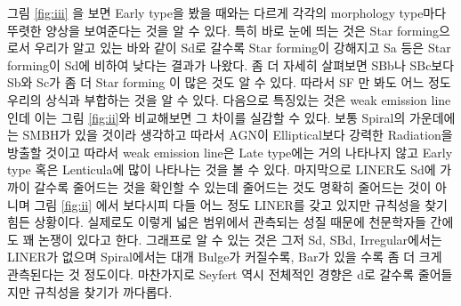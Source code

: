 \documentclass[a4paper,11pt]{article}
\begin{document}
그림 \ref{fig:iii} 을 보면 Early type을 봤을 때와는 다르게 각각의 morphology type마다 뚜렷한 양상을 보여준다는 것을 알 수 있다. 
특히 바로 눈에 띄는 것은 Star forming으로서 우리가 알고 있는 바와 같이 Sd로 갈수록 Star forming이 강해지고 Sa 등은 Star forming이 Sd에 비하여 낮다는 결과가 나왔다.
좀 더 자세히 살펴보면 SBb나 SBc보다 Sb와 Sc가 좀 더 Star forming 이 많은 것도 알 수 있다. 따라서 SF 만 봐도 어느 정도 우리의 상식과 부합하는 것을 알 수 있다. 
다음으로 특징있는 것은 weak emission line인데 이는 그림 \ref{fig:ii}와 비교해보면 그 차이를 실감할 수 있다. 보통 Spiral의 가운데에는 SMBH가 있을 것이라 생각하고
따라서 AGN이 Elliptical보다 강력한 Radiation을 방출할 것이고 따라서 weak emission line은 Late type에는 거의 나타나지 않고 Early type 혹은 Lenticula에 많이 나타나는 것을 볼 수 있다.
마지막으로 LINER도 Sd에 가까이 갈수록 줄어드는 것을 확인할 수 있는데 줄어드는 것도 명확히 줄어드는 것이 아니며 그림 \ref{fig:ii} 에서 보다시피 다들 어느 정도 LINER를 갖고 있지만 규칙성을 찾기 힘든 상황이다.
실제로도 이렇게 넓은 범위에서 관측되는 성질 때문에 천문학자들 간에도 꽤 논쟁이 있다고 한다. 그래프로 알 수 있는 것은 그저 Sd, SBd, Irregular에서는 LINER가 없으며 Spiral에서는 대개 Bulge가 커질수록,
Bar가 있을 수록 좀 더 크게 관측된다는 것 정도이다. 마찬가지로 Seyfert 역시 전체적인 경향은 d로 갈수록 줄어들지만 규칙성을 찾기가 까다롭다.
\end{document}
